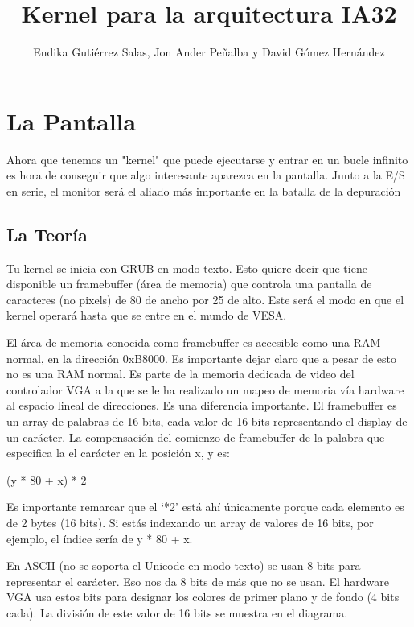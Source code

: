 \documentclass{report}
\begin{document}
\title{Kernel para la arquitectura IA32}
\author{Endika Guti\'errez Salas, Jon Ander Pe\~nalba y David G\'omez Hern\'andez}
\maketitle

\tableofcontents

\chapter{La Pantalla}

Ahora que tenemos un "kernel" que puede ejecutarse y entrar en un bucle infinito es hora de conseguir que algo interesante aparezca en la pantalla. Junto a la E/S en serie, el monitor ser\'a el aliado m\'as importante en la batalla de la depuraci\'on

\section{La Teor\'ia}

Tu kernel se inicia con GRUB en modo texto. Esto quiere decir que tiene disponible un framebuffer (\'area de memoria) que controla una pantalla de caracteres (no pixels) de 80 de ancho por 25 de alto. Este ser\'a el modo en que el kernel operar\'a hasta que se entre en el mundo de VESA.

El \'area de memoria conocida como framebuffer es accesible como una RAM normal, en la direcci\'on 0xB8000. Es importante dejar claro que a pesar de esto no es una RAM normal. Es parte de la memoria dedicada de video del controlador VGA a la que se le ha realizado un mapeo de memoria v\'ia hardware al espacio lineal de direcciones. Es una diferencia importante.
El framebuffer es un array de palabras de 16 bits, cada valor de 16 bits representando el display de un car\'acter. La compensaci\'on del comienzo de framebuffer de la palabra que especifica la el car\'acter en la posici\'on x, y es:

(y * 80 + x) * 2

Es importante remarcar que el ‘*2’ est\'a ah\'i \'unicamente porque cada elemento es de 2 bytes (16 bits). Si est\'as indexando un array de valores de 16 bits, por ejemplo, el \'indice ser\'ia de y * 80 + x.

En ASCII (no se soporta el Unicode en modo texto) se usan 8 bits para representar el car\'{a}cter. Eso nos da 8 bits de m\'as que no se usan. El hardware VGA usa estos bits para designar los colores de primer plano y de fondo (4 bits cada). La divisi\'on de este valor de 16 bits se muestra en el diagrama.
\end{document}
